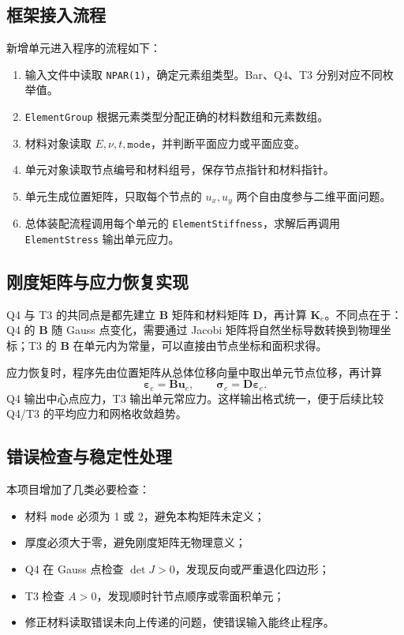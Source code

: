 ﻿\documentclass[UTF8,11pt,a4paper]{ctexart}
\begin{document}
\subsection{框架接入流程}
新增单元进入程序的流程如下：
\begin{enumerate}
  \item 输入文件中读取 \texttt{NPAR(1)}，确定元素组类型。Bar、Q4、T3 分别对应不同枚举值。
  \item \texttt{ElementGroup} 根据元素类型分配正确的材料数组和元素数组。
  \item 材料对象读取 $E,\nu,t,\texttt{mode}$，并判断平面应力或平面应变。
  \item 单元对象读取节点编号和材料组号，保存节点指针和材料指针。
  \item 单元生成位置矩阵，只取每个节点的 $u_x,u_y$ 两个自由度参与二维平面问题。
  \item 总体装配流程调用每个单元的 \texttt{ElementStiffness}，求解后再调用 \texttt{ElementStress} 输出单元应力。
\end{enumerate}

\subsection{刚度矩阵与应力恢复实现}
Q4 与 T3 的共同点是都先建立 $\bm B$ 矩阵和材料矩阵 $\bm D$，再计算 $\bm K_e$。不同点在于：Q4 的 $\bm B$ 随 Gauss 点变化，需要通过 Jacobi 矩阵将自然坐标导数转换到物理坐标；T3 的 $\bm B$ 在单元内为常量，可以直接由节点坐标和面积求得。

应力恢复时，程序先由位置矩阵从总体位移向量中取出单元节点位移，再计算
\begin{equation}
\bm\varepsilon_e=\bm B\bm u_e,\qquad \bm\sigma_e=\bm D\bm\varepsilon_e.
\end{equation}
Q4 输出中心点应力，T3 输出单元常应力。这样输出格式统一，便于后续比较 Q4/T3 的平均应力和网格收敛趋势。

\subsection{错误检查与稳定性处理}
本项目增加了几类必要检查：
\begin{itemize}
  \item 材料 \texttt{mode} 必须为 1 或 2，避免本构矩阵未定义；
  \item 厚度必须大于零，避免刚度矩阵无物理意义；
  \item Q4 在 Gauss 点检查 $\det J>0$，发现反向或严重退化四边形；
  \item T3 检查 $A>0$，发现顺时针节点顺序或零面积单元；
  \item 修正材料读取错误未向上传递的问题，使错误输入能终止程序。
\end{itemize}
\end{document}
